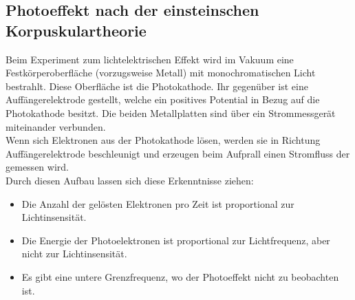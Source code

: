 \subsection{Photoeffekt nach der einsteinschen Korpuskulartheorie}

Beim Experiment zum lichtelektrischen Effekt wird im Vakuum 
eine Festkörperoberfläche (vorzugsweise Metall) mit monochromatischen
Licht bestrahlt. Diese Oberfläche ist die Photokathode. Ihr gegenüber
ist eine Auffängerelektrode gestellt, welche ein positives Potential
in Bezug auf die Photokathode besitzt. Die beiden Metallplatten
sind über ein Strommessgerät miteinander verbunden.\\
Wenn sich Elektronen aus der Photokathode lösen, werden sie in Richtung
Auffängerelektrode beschleunigt und erzeugen beim Aufprall einen Stromfluss
der gemessen wird.\\
Durch diesen Aufbau lassen sich diese Erkenntnisse ziehen:
\begin{itemize}
    \item Die Anzahl der gelösten Elektronen pro Zeit ist proportional zur Lichtinsensität.
    \item Die Energie der Photoelektronen ist proportional zur Lichtfrequenz, aber nicht zur Lichtinsensität.
    \item Es gibt eine untere Grenzfrequenz, wo der Photoeffekt nicht zu beobachten ist.
\end{itemize}

